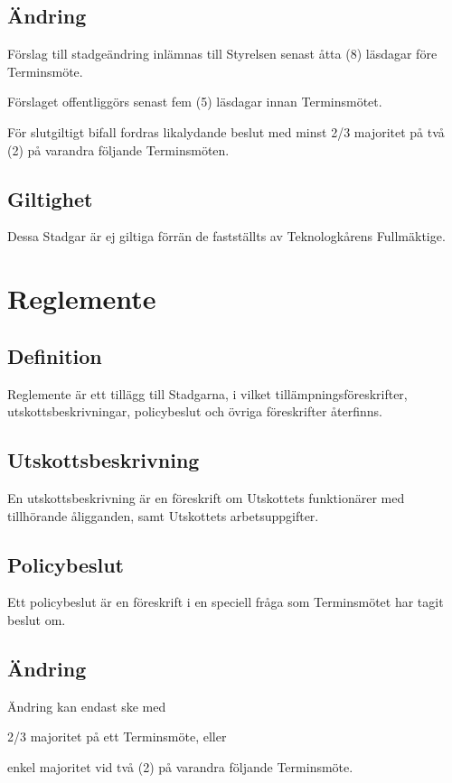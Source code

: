 \documentclass[10pt]{article}
\begin{document}
\subsection{Ändring}
Förslag till stadgeändring inlämnas till Styrelsen senast åtta (8) läsdagar
före Terminsmöte.

Förslaget offentliggörs senast fem (5) läsdagar innan Terminsmötet.

För slutgiltigt bifall fordras likalydande beslut med minst 2/3 majoritet på
två (2) på varandra följande Terminsmöten.

\subsection{Giltighet}
Dessa Stadgar är ej giltiga förrän de fastställts av Teknologkårens
Fullmäktige.
\newpage

\section{Reglemente}
\subsection{Definition}
Reglemente är ett tillägg till Stadgarna, i vilket tillämpningsföreskrifter,
utskottsbeskrivningar, policybeslut och övriga föreskrifter återfinns.

\subsection{Utskottsbeskrivning}
En utskottsbeskrivning är en föreskrift om Utskottets funktionärer med
tillhörande åligganden, samt Utskottets arbetsuppgifter.

\subsection{Policybeslut}
Ett policybeslut är en föreskrift i en speciell fråga som Terminsmötet har
tagit beslut om.

\subsection{Ändring}
Ändring kan endast ske med
\begin{alphlist}
\item 2/3 majoritet på ett Terminsmöte, eller
\item enkel majoritet vid två (2) på varandra följande Terminsmöte.
\end{alphlist}
\end{document}
